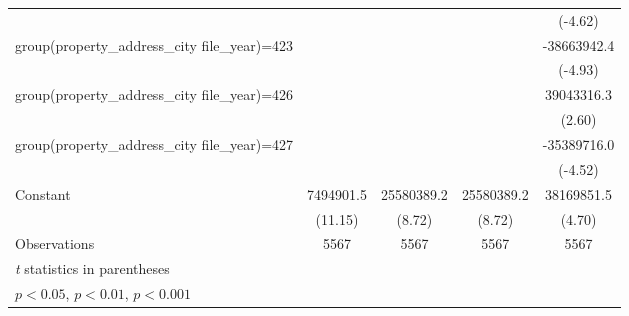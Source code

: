 {\begin{tabular}{l*{4}{c}}
                    &                     &                     &                     &     (-4.62)         \\
\addlinespace
group(property\_address\_city file\_year)=423&                     &                     &                     & -38663942.4\sym{***}\\
                    &                     &                     &                     &     (-4.93)         \\
\addlinespace
group(property\_address\_city file\_year)=426&                     &                     &                     &  39043316.3\sym{**} \\
                    &                     &                     &                     &      (2.60)         \\
\addlinespace
group(property\_address\_city file\_year)=427&                     &                     &                     & -35389716.0\sym{***}\\
                    &                     &                     &                     &     (-4.52)         \\
\addlinespace
Constant            &   7494901.5\sym{***}&  25580389.2\sym{***}&  25580389.2\sym{***}&  38169851.5\sym{***}\\
                    &     (11.15)         &      (8.72)         &      (8.72)         &      (4.70)         \\
\midrule
Observations        &        5567         &        5567         &        5567         &        5567         \\
\bottomrule
\multicolumn{5}{l}{\footnotesize \textit{t} statistics in parentheses}\\
\multicolumn{5}{l}{\footnotesize \sym{*} \(p<0.05\), \sym{**} \(p<0.01\), \sym{***} \(p<0.001\)}\\
\end{tabular}
}
